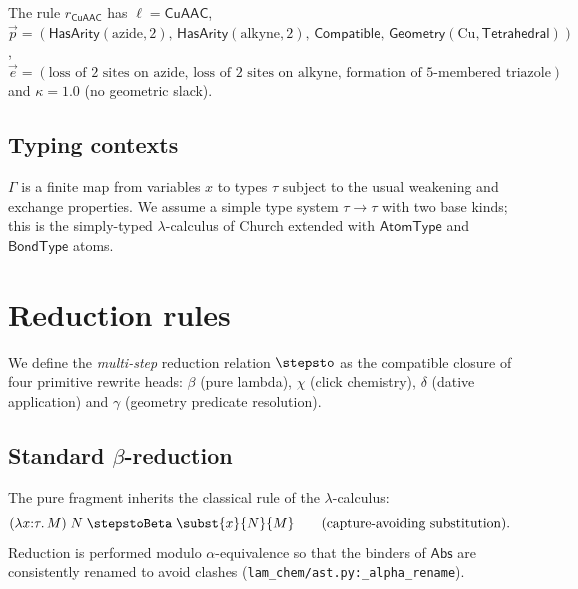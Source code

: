 \begin{example}
The rule $r_{\mathsf{CuAAC}}$ has
$\ell = \mathsf{CuAAC}$,
$\vec p = (\mathsf{HasArity}(\text{azide},2),\,
          \mathsf{HasArity}(\text{alkyne},2),\,
          \mathsf{Compatible},\,
          \mathsf{Geometry}(\text{Cu},\mathsf{Tetrahedral}))$,
$\vec e = (\text{loss of 2 sites on azide},\, \text{loss of 2 sites on alkyne},\,
           \text{formation of 5-membered triazole})$
and $\kappa = 1.0$ (no geometric slack).
\end{example}

\subsection{Typing contexts}
$\Gamma$ is a finite map from variables $x$ to types $\tau$ subject to the
usual weakening and exchange properties. We assume a simple type system
$\tau \to \tau$ with two base kinds; this is the simply-typed $\lambda$-calculus
of Church extended with $\mathsf{AtomType}$ and $\mathsf{BondType}$ atoms.

\section{Reduction rules}
\label{sec:reduction}
We define the \emph{multi-step} reduction relation $\stepsto$ as the
compatible closure of four primitive rewrite heads: $\beta$ (pure lambda),
$\chi$ (click chemistry), $\delta$ (dative application) and $\gamma$
(geometry predicate resolution).

\subsection{Standard $\beta$-reduction}
The pure fragment inherits the classical rule of the $\lambda$-calculus:
\begin{equation*}
  (\lambda x{:}\tau.\, M)\; N \;\stepstoBeta\; \subst{x}{N}{M}
  \qquad\text{(capture-avoiding substitution)}.
\end{equation*}
Reduction is performed modulo $\alpha$-equivalence so that the binders of
$\mathsf{Abs}$ are consistently renamed to avoid clashes
(\texttt{lam\_chem/ast.py:\_alpha\_rename}).

